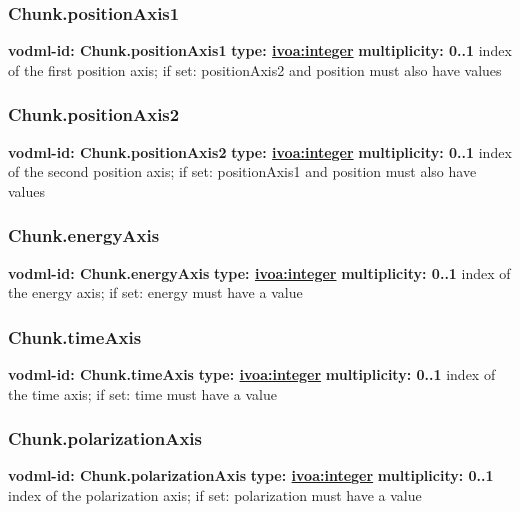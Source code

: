     \subsubsection{Chunk.positionAxis1}
      \textbf{vodml-id: Chunk.positionAxis1} \newline
      \textbf{type: \hyperref[sect:ivoa]{ivoa:integer}} \newline
      \textbf{multiplicity: 0..1} \newline
      index of the first position axis; if set: positionAxis2 and position must also have values

    \subsubsection{Chunk.positionAxis2}
      \textbf{vodml-id: Chunk.positionAxis2} \newline
      \textbf{type: \hyperref[sect:ivoa]{ivoa:integer}} \newline
      \textbf{multiplicity: 0..1} \newline
      index of the second position axis; if set: positionAxis1 and position must also have values

    \subsubsection{Chunk.energyAxis}
      \textbf{vodml-id: Chunk.energyAxis} \newline
      \textbf{type: \hyperref[sect:ivoa]{ivoa:integer}} \newline
      \textbf{multiplicity: 0..1} \newline
      index of the energy axis; if set: energy must have a value

    \subsubsection{Chunk.timeAxis}
      \textbf{vodml-id: Chunk.timeAxis} \newline
      \textbf{type: \hyperref[sect:ivoa]{ivoa:integer}} \newline
      \textbf{multiplicity: 0..1} \newline
      index of the time axis; if set: time must have a value

    \subsubsection{Chunk.polarizationAxis}
      \textbf{vodml-id: Chunk.polarizationAxis} \newline
      \textbf{type: \hyperref[sect:ivoa]{ivoa:integer}} \newline
      \textbf{multiplicity: 0..1} \newline
      index of the polarization axis; if set: polarization must have a value

